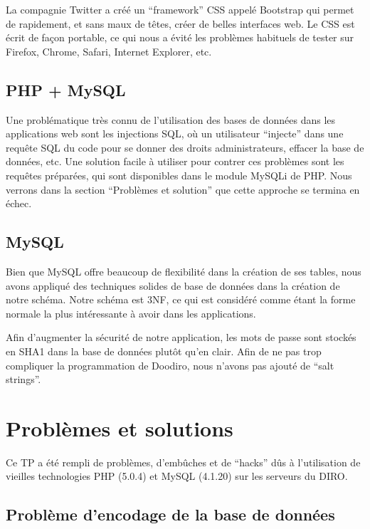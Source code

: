 \documentclass[10pt]{article}
\begin{document}
La compagnie Twitter a créé un ``framework'' CSS appelé Bootstrap qui
permet de rapidement, et sans maux de têtes, créer de belles
interfaces web.  Le CSS est écrit de façon portable, ce qui nous a
évité les problèmes habituels de tester sur Firefox, Chrome, Safari,
Internet Explorer, etc.

\subsection{PHP + MySQL}

Une problématique très connu de l'utilisation des bases de données
dans les applications web sont les injections SQL, où un utilisateur
``injecte'' dans une requête SQL du code pour se donner des droits
administrateurs, effacer la base de données, etc.  Une solution facile
à utiliser pour contrer ces problèmes sont les requêtes préparées, qui
sont disponibles dans le module MySQLi de PHP.  Nous verrons dans la
section ``Problèmes et solution'' que cette approche se termina en
échec.

\subsection{MySQL}

Bien que MySQL offre beaucoup de flexibilité dans la création de ses
tables, nous avons appliqué des techniques solides de base de données
dans la création de notre schéma.  Notre schéma est 3NF, ce qui est
considéré comme étant la forme normale la plus intéressante à avoir
dans les applications.

Afin d'augmenter la sécurité de notre application, les mots de passe
sont stockés en SHA1 dans la base de données plutôt qu'en clair.  Afin
de ne pas trop compliquer la programmation de Doodiro, nous n'avons
pas ajouté de ``salt strings''.


\section{Problèmes et solutions}

Ce TP a été rempli de problèmes, d'embûches et de ``hacks'' dûs à
l'utilisation de vieilles technologies PHP (5.0.4) et MySQL (4.1.20)
sur les serveurs du DIRO.

\subsection{Problème d'encodage de la base de données}
\end{document}
